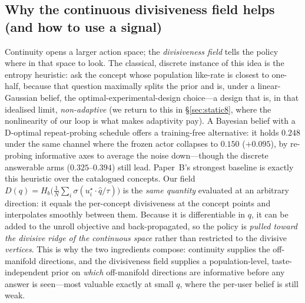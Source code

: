 \documentclass[11pt]{article}
\newcommand{\ustar}{u^{\star}}
\begin{document}
\subsection{Why the continuous divisiveness field helps (and how to use a signal)}\label{sec:whydiv}
Continuity opens a larger action space; the \emph{divisiveness field} tells the policy where in that space to look. The
classical, discrete instance of this idea is the entropy heuristic: ask the concept whose population like-rate is closest
to one-half, because that question maximally splits the prior and is, under a linear-Gaussian belief, the
optimal-experimental-design choice---a design that is, in that idealised limit, \emph{non-adaptive} (we return to this in
\S\ref{sec:static8}, where the nonlinearity of our loop is what makes adaptivity pay). A Bayesian belief with a D-optimal repeat-probing schedule offers a training-free alternative: it holds $0.248$ under the same channel where the frozen actor collapses to $0.150$ ($+0.095$), by re-probing informative axes to average the noise down---though the discrete answerable arms ($0.325$--$0.394$) still lead. Paper~B's strongest baseline is
exactly this heuristic over the catalogued concepts.
Our field $D(q)=H_b\!\big(\tfrac1N\sum_i\sigma(\ustar_i\!\cdot\hat q/\tau)\big)$ is the \emph{same quantity} evaluated at
an arbitrary direction: it equals the per-concept divisiveness at the concept points and interpolates smoothly between
them. Because it is differentiable in $q$, it can be added to the unroll objective and back-propagated, so the policy is
\emph{pulled toward the divisive ridge of the continuous space} rather than restricted to the divisive \emph{vertices}.
This is why the two ingredients compose: continuity supplies the off-manifold directions, and the divisiveness field
supplies a population-level, taste-independent prior on \emph{which} off-manifold directions are informative before any
answer is seen---most valuable exactly at small $q$, where the per-user belief is still weak.
\end{document}
